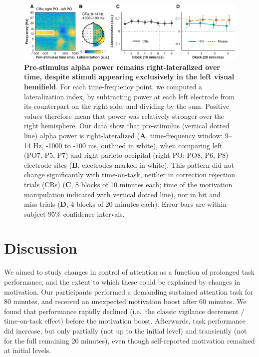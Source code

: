 \documentclass[11pt,english,]{memoir}
\newcommand{\blandscape}{\begin{landscape}}
\newcommand{\elandscape}{\end{landscape}}
\def\defstyle{Ruled} %
\begin{document}
\newpage
\pagestyle{empty}
\blandscape

\begin{figure}
\includegraphics[width=190mm]{MFBrain_files/figures/figure_5_latindex} \caption{\textbf{Pre-stimulus alpha power remains right-lateralized over time, despite stimuli appearing exclusively in the left visual hemifield}. For each time-frequency point, we computed a lateralization index, by subtracting power at each left electrode from its counterpart on the right side, and dividing by the sum. Positive values therefore mean that power was relatively stronger over the right hemisphere. Our data show that pre-stimulus (vertical dotted line) alpha power is right-lateralized (\textbf{A}, time-frequency window: 9--14 Hz, -1000 to -100 ms, outlined in white), when comparing left (PO7, P5, P7) and right parieto-occipital (right PO: PO8, P6, P8) electrode sites (\textbf{B}, electrodes marked in white). This pattern did not change significantly with time-on-task, neither in correction rejection trials (CRs) (\textbf{C}, 8 blocks of 10 minutes each; time of the motivation manipulation indicated with vertical dotted line), nor in hit and miss trials (\textbf{D}, 4 blocks of 20 minutes each). Error bars are within-subject \autocites{Cousineau2005}{Morey2008} 95\% confidence intervals.}\label{fig:figure-5-latindex}
\end{figure}

\newpage
\elandscape
\pagestyle{\defstyle}

\hypertarget{MFBrain-discussion}{%
\section{Discussion}\label{MFBrain-discussion}}

We aimed to study changes in control of attention as a function of prolonged task performance, and the extent to which these could be explained by changes in motivation. Our participants performed a demanding sustained attention task for 80 minutes, and received an unexpected motivation boost after 60 minutes. We found that performance rapidly declined (i.e.~the classic vigilance decrement / time-on-task effect) before the motivation boost. Afterwards, task performance did increase, but only partially (not up to the initial level) and transiently (not for the full remaining 20 minutes), even though self-reported motivation remained at initial levels.
\end{document}
